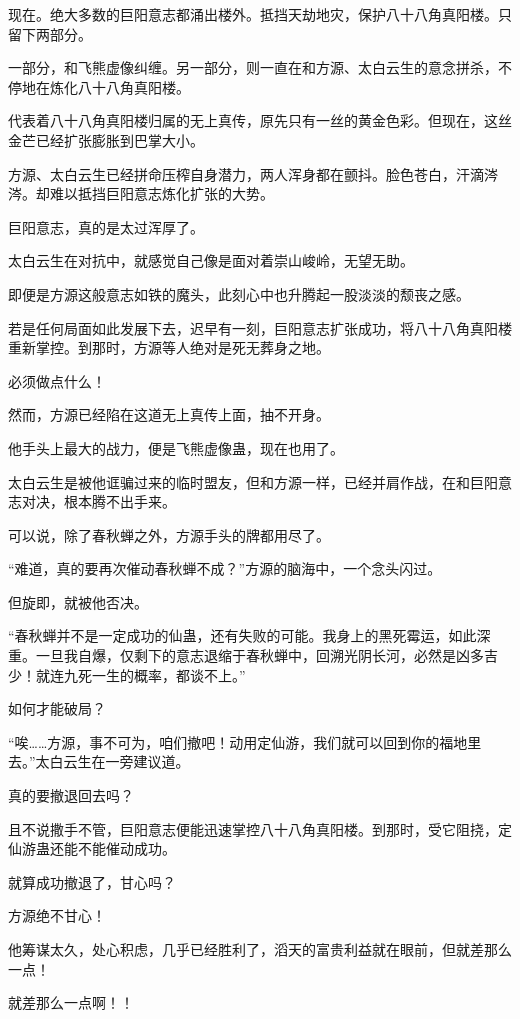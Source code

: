\begin{this_body}
现在。绝大多数的巨阳意志都涌出楼外。抵挡天劫地灾，保护八十八角真阳楼。只留下两部分。

一部分，和飞熊虚像纠缠。另一部分，则一直在和方源、太白云生的意念拼杀，不停地在炼化八十八角真阳楼。

代表着八十八角真阳楼归属的无上真传，原先只有一丝的黄金色彩。但现在，这丝金芒已经扩张膨胀到巴掌大小。

方源、太白云生已经拼命压榨自身潜力，两人浑身都在颤抖。脸色苍白，汗滴涔涔。却难以抵挡巨阳意志炼化扩张的大势。

巨阳意志，真的是太过浑厚了。

太白云生在对抗中，就感觉自己像是面对着崇山峻岭，无望无助。

即便是方源这般意志如铁的魔头，此刻心中也升腾起一股淡淡的颓丧之感。

若是任何局面如此发展下去，迟早有一刻，巨阳意志扩张成功，将八十八角真阳楼重新掌控。到那时，方源等人绝对是死无葬身之地。

必须做点什么！

然而，方源已经陷在这道无上真传上面，抽不开身。

他手头上最大的战力，便是飞熊虚像蛊，现在也用了。

太白云生是被他诓骗过来的临时盟友，但和方源一样，已经并肩作战，在和巨阳意志对决，根本腾不出手来。

可以说，除了春秋蝉之外，方源手头的牌都用尽了。

“难道，真的要再次催动春秋蝉不成？”方源的脑海中，一个念头闪过。

但旋即，就被他否决。

“春秋蝉并不是一定成功的仙蛊，还有失败的可能。我身上的黑死霉运，如此深重。一旦我自爆，仅剩下的意志退缩于春秋蝉中，回溯光阴长河，必然是凶多吉少！就连九死一生的概率，都谈不上。”

如何才能破局？

“唉……方源，事不可为，咱们撤吧！动用定仙游，我们就可以回到你的福地里去。”太白云生在一旁建议道。

真的要撤退回去吗？

且不说撒手不管，巨阳意志便能迅速掌控八十八角真阳楼。到那时，受它阻挠，定仙游蛊还能不能催动成功。

就算成功撤退了，甘心吗？

方源绝不甘心！

他筹谋太久，处心积虑，几乎已经胜利了，滔天的富贵利益就在眼前，但就差那么一点！

就差那么一点啊！！


\end{this_body}
